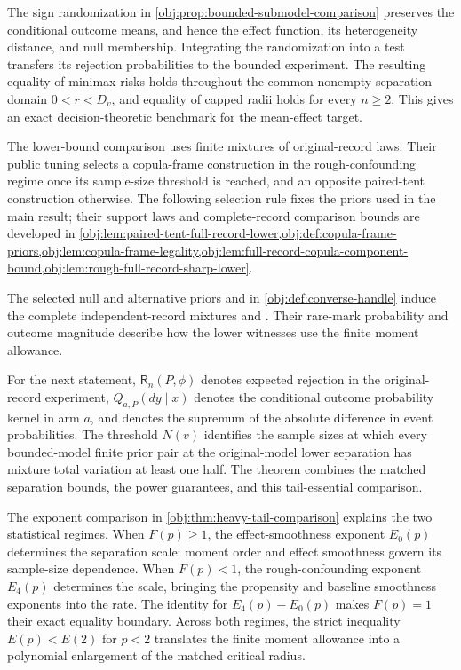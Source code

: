 \documentclass[11pt]{article}
\begin{document}
The sign randomization in \cref{obj:prop:bounded-submodel-comparison} preserves the conditional outcome means, and hence the effect function, its heterogeneity distance, and null membership. Integrating the randomization into a test transfers its rejection probabilities to the bounded experiment. The resulting equality of minimax risks holds throughout the common nonempty separation domain \(0<r<D_v\), and equality of capped radii holds for every \(n\ge2\). This gives an exact decision-theoretic benchmark for the mean-effect target.

The lower-bound comparison uses finite mixtures of original-record laws. Their public tuning selects a copula-frame construction in the rough-confounding regime once its sample-size threshold is reached, and an opposite paired-tent construction otherwise. The following selection rule fixes the priors used in the main result; their support laws and complete-record comparison bounds are developed in \cref{obj:lem:paired-tent-full-record-lower,obj:def:copula-frame-priors,obj:lem:copula-frame-legality,obj:lem:full-record-copula-component-bound,obj:lem:rough-full-record-sharp-lower}.



The selected null and alternative priors  and  in \cref{obj:def:converse-handle} induce the complete independent-record mixtures  and . Their rare-mark probability  and outcome magnitude  describe how the lower witnesses use the finite moment allowance.

For the next statement, \(\mathsf R_n(P,\phi)\) denotes expected rejection in the original-record experiment, \(Q_{a,P}(dy\mid x)\) denotes the conditional outcome probability kernel in arm \(a\), and  denotes the supremum of the absolute difference in event probabilities. The threshold \(N(v)\) identifies the sample sizes at which every bounded-model finite prior pair at the original-model lower separation has mixture total variation at least one half. The theorem combines the matched separation bounds, the power guarantees, and this tail-essential comparison.



The exponent comparison in \cref{obj:thm:heavy-tail-comparison} explains the two statistical regimes. When \(F(p)\ge1\), the effect-smoothness exponent \(E_0(p)\) determines the separation scale: moment order and effect smoothness govern its sample-size dependence. When \(F(p)<1\), the rough-confounding exponent \(E_4(p)\) determines the scale, bringing the propensity and baseline smoothness exponents into the rate. The identity for \(E_4(p)-E_0(p)\) makes \(F(p)=1\) their exact equality boundary. Across both regimes, the strict inequality \(E(p)<E(2)\) for \(p<2\) translates the finite moment allowance into a polynomial enlargement of the matched critical radius.
\end{document}
